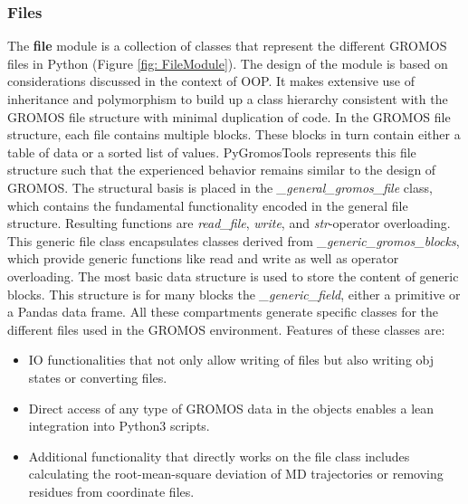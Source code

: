 \subsubsection{Files}
The \textbf{file} module is a collection of classes that represent the different GROMOS files in Python (Figure \ref{fig: FileModule}). The design of the module is based on considerations discussed in the context of OOP. It makes extensive use of inheritance and polymorphism to build up a class hierarchy consistent with the GROMOS file structure with minimal duplication of code.
In the GROMOS file structure, each file contains multiple blocks. These blocks in turn contain either a table of data or a sorted list of values. PyGromosTools represents this file structure such that the experienced behavior remains similar to the design of GROMOS. The structural basis is placed in the \textit{\_general\_gromos\_file} class, which contains the fundamental functionality encoded in the general file structure. Resulting functions are \textit{read\_file}, \textit{write}, and \textit{str}-operator overloading.
This generic file class encapsulates classes derived from \textit{\_generic\_gromos\_blocks}, which provide generic functions like read and write as well as operator overloading. 
The most basic data structure is used to store the content of generic blocks. This structure is for many blocks the \textit{\_generic\_field}, either a primitive or a Pandas data frame.
%
All these compartments generate specific classes for the different files used in the GROMOS environment. Features of these classes are: 
\begin{itemize}
    \item IO functionalities that not only allow writing of files but also writing obj states or converting files.
    \item Direct access of any type of GROMOS data in the objects enables a lean integration into Python3 scripts.
    \item Additional functionality that directly works on the file class includes calculating the root-mean-square deviation of MD trajectories or removing residues from coordinate files.
\end{itemize}


